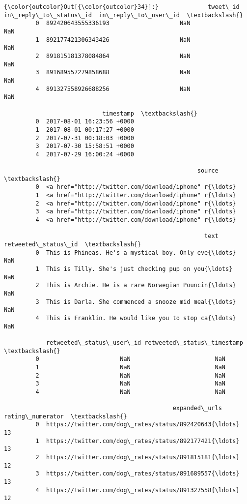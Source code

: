 \documentclass[11pt]{article}
\begin{document}
\begin{Verbatim}[commandchars=\\\{\}]
{\color{outcolor}Out[{\color{outcolor}34}]:}              tweet\_id  in\_reply\_to\_status\_id  in\_reply\_to\_user\_id  \textbackslash{}
         0  892420643555336193                    NaN                  NaN   
         1  892177421306343426                    NaN                  NaN   
         2  891815181378084864                    NaN                  NaN   
         3  891689557279858688                    NaN                  NaN   
         4  891327558926688256                    NaN                  NaN   
         
                            timestamp  \textbackslash{}
         0  2017-08-01 16:23:56 +0000   
         1  2017-08-01 00:17:27 +0000   
         2  2017-07-31 00:18:03 +0000   
         3  2017-07-30 15:58:51 +0000   
         4  2017-07-29 16:00:24 +0000   
         
                                                       source  \textbackslash{}
         0  <a href="http://twitter.com/download/iphone" r{\ldots}   
         1  <a href="http://twitter.com/download/iphone" r{\ldots}   
         2  <a href="http://twitter.com/download/iphone" r{\ldots}   
         3  <a href="http://twitter.com/download/iphone" r{\ldots}   
         4  <a href="http://twitter.com/download/iphone" r{\ldots}   
         
                                                         text  retweeted\_status\_id  \textbackslash{}
         0  This is Phineas. He's a mystical boy. Only eve{\ldots}                  NaN   
         1  This is Tilly. She's just checking pup on you{\ldots}                  NaN   
         2  This is Archie. He is a rare Norwegian Pouncin{\ldots}                  NaN   
         3  This is Darla. She commenced a snooze mid meal{\ldots}                  NaN   
         4  This is Franklin. He would like you to stop ca{\ldots}                  NaN   
         
            retweeted\_status\_user\_id retweeted\_status\_timestamp  \textbackslash{}
         0                       NaN                        NaN   
         1                       NaN                        NaN   
         2                       NaN                        NaN   
         3                       NaN                        NaN   
         4                       NaN                        NaN   
         
                                                expanded\_urls  rating\_numerator  \textbackslash{}
         0  https://twitter.com/dog\_rates/status/892420643{\ldots}                13   
         1  https://twitter.com/dog\_rates/status/892177421{\ldots}                13   
         2  https://twitter.com/dog\_rates/status/891815181{\ldots}                12   
         3  https://twitter.com/dog\_rates/status/891689557{\ldots}                13   
         4  https://twitter.com/dog\_rates/status/891327558{\ldots}                12   
         

\end{Verbatim}
\end{document}
